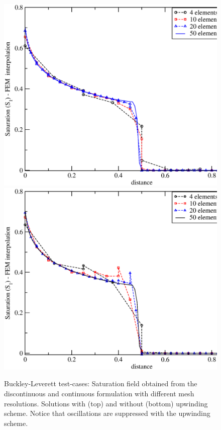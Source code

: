 \begin{figure}[h]
\vbox{
\hbox{\hspace{.3cm}\includegraphics[width=.9\textwidth]{bl-dg-4-10-20}}
\vspace{-0.cm}
\hbox{\hspace{.3cm}\includegraphics[width=.9\textwidth]{bl-dg-cent-4-10-20}}}
\caption{Buckley-Leverett test-cases: Saturation field obtained from the discontinuous and continuous formulation with different mesh resolutions. Solutions with (top) and without (bottom) upwinding scheme. Notice that oscillations are suppressed with the upwinding scheme.\label{bl-dg-cent-4-10-20}}
\end{figure}



